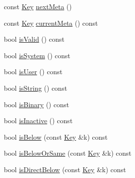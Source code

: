 \begin{DoxyCompactItemize}
const \hyperlink{classkdb_1_1Key}{Key} \hyperlink{classkdb_1_1Key_a855f37fef58a4ea4006d9e281f66cfe1}{next\-Meta} ()
\begin{DoxyCompactList}\small\item\em \end{DoxyCompactList}\item 
const \hyperlink{classkdb_1_1Key}{Key} \hyperlink{classkdb_1_1Key_a2be586ccd64cd280561ba5cd23f6ff1e}{current\-Meta} () const 
\begin{DoxyCompactList}\small\item\em \end{DoxyCompactList}\item 
bool \hyperlink{classkdb_1_1Key_acbb13cfcabb4548177e86eec1ac16d87}{is\-Valid} () const 
\item 
bool \hyperlink{classkdb_1_1Key_ac0f21b82a3d851eb3dfae53ddcfdbe48}{is\-System} () const 
\item 
bool \hyperlink{classkdb_1_1Key_ab6103772c702b400eaefbc4665f5c0cf}{is\-User} () const 
\item 
bool \hyperlink{classkdb_1_1Key_aa60e37609593de715c342740c76040cc}{is\-String} () const 
\begin{DoxyCompactList}\small\item\em \end{DoxyCompactList}\item 
bool \hyperlink{classkdb_1_1Key_aad92210fe2389ad950a47a4eca428574}{is\-Binary} () const 
\begin{DoxyCompactList}\small\item\em \end{DoxyCompactList}\item 
bool \hyperlink{classkdb_1_1Key_adcd75cc13e9d766eaac72beb7d748bdb}{is\-Inactive} () const 
\begin{DoxyCompactList}\small\item\em \end{DoxyCompactList}\item 
bool \hyperlink{classkdb_1_1Key_a493893308d5b4c54d646cc0df5a076ae}{is\-Below} (const \hyperlink{classkdb_1_1Key}{Key} \&k) const 
\begin{DoxyCompactList}\small\item\em \end{DoxyCompactList}\item 
bool \hyperlink{classkdb_1_1Key_a0d4d2d50f9e3624ade560b0f74267d86}{is\-Below\-Or\-Same} (const \hyperlink{classkdb_1_1Key}{Key} \&k) const 
\begin{DoxyCompactList}\small\item\em \end{DoxyCompactList}\item 
bool \hyperlink{classkdb_1_1Key_a3cc66b309bd42e67d7bc0e4234aa76a1}{is\-Direct\-Below} (const \hyperlink{classkdb_1_1Key}{Key} \&k) const 
\begin{DoxyCompactList}\small\item\em \end{DoxyCompactList}\end{DoxyCompactItemize}


